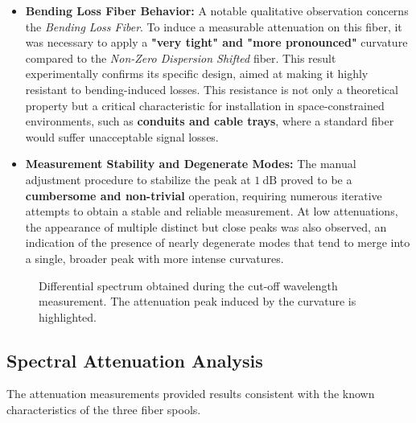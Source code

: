 \documentclass[a4paper,11pt]{article}
\theoremstyle{mythmstyle}
\begin{document}
\begin{itemize}
    \item \textbf{Bending Loss Fiber Behavior:} A notable qualitative observation concerns the \textit{Bending Loss Fiber}. To induce a measurable attenuation on this fiber, it was necessary to apply a \textbf{"very tight" and "more pronounced"} curvature compared to the \textit{Non-Zero Dispersion Shifted} fiber. This result experimentally confirms its specific design, aimed at making it highly resistant to bending-induced losses. This resistance is not only a theoretical property but a critical characteristic for installation in space-constrained environments, such as \textbf{conduits and cable trays}, where a standard fiber would suffer unacceptable signal losses.
    
    \item \textbf{Measurement Stability and Degenerate Modes:} The manual adjustment procedure to stabilize the peak at $1\ \text{dB}$ proved to be a \textbf{cumbersome and non-trivial} operation, requiring numerous iterative attempts to obtain a stable and reliable measurement. At low attenuations, the appearance of multiple distinct but close peaks was also observed, an indication of the presence of nearly degenerate modes that tend to merge into a single, broader peak with more intense curvatures.
\end{itemize}

\begin{figure}[H]
    \centering
    \framebox[0.8\linewidth]{\rule{0pt}{5cm} }
    \caption{Differential spectrum obtained during the cut-off wavelength measurement. The attenuation peak induced by the curvature is highlighted.}
    \label{fig:cutoff}
\end{figure}

\subsection{Spectral Attenuation Analysis}
The attenuation measurements provided results consistent with the known characteristics of the three fiber spools.
\end{document}
